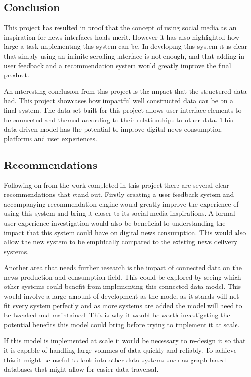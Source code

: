 \documentclass[12pt,titlepage]{article}
\begin{document}
  \subsection{Conclusion}

  This project has resulted in proof that the concept of using social media as
  an inspiration for news interfaces holds merit. However it has also highlighted
  how large a task implementing this system can be. In developing this system it
  is clear that simply using an infinite scrolling interface is not enough, and
  that adding in user feedback and a recommendation system would greatly improve
  the final product.

  An interesting conclusion from this project is the impact that the structured
  data had. This project showcases how impactful well constructed data can be on
  a final system. The data set built for this project allows user interface
  elements to be connected and themed according to their relationships to other
  data. This data-driven model has the potential to improve digital news
  consumption platforms and user experiences.

  \subsection{Recommendations}

  Following on from the work completed in this project there are several clear
  recommendations that stand out. Firstly creating a user feedback system and
  accompanying recommendation engine would greatly improve the experience of
  using this system and bring it closer to its social media inspirations. A
  formal user experience investigation would also be beneficial to understanding
  the impact that this system could have on digital news consumption. This would
  also allow the new system to be empirically compared to the existing news
  delivery systems.

  Another area that needs further research is the impact of connected data on
  the news production and consumption field. This could be explored by seeing
  which other systems could benefit from implementing this connected data model.
  This would involve a large amount of development as the model as it stands
  will not fit every system perfectly and as more systems are added the model
  will need to be tweaked and maintained. This is why it would be worth
  investigating the potential benefits this model could bring before trying to
  implement it at scale.

  If this model is implemented at scale it would be necessary to re-design it so
  that it is capable of handling large volumes of data quickly and reliably. To
  achieve this it might be useful to look into other data systems such as graph
  based databases that might allow for easier data traversal.


\end{document}
